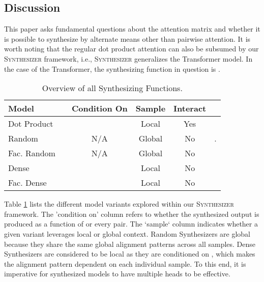 \documentclass{article} \usepackage{iclr2021_conference,times}
\begin{document}
\subsection{Discussion}
This paper asks fundamental questions about the attention matrix  and whether it is possible to synthesize  by alternate means other than pairwise attention. It is worth noting that the regular dot product attention can also be subsumed by our \textsc{Synthesizer} framework, i.e., \textsc{Synthesizer} generalizes the Transformer model. In the case of the Transformer, the synthesizing function in question is .  
\begin{table}[H]
\small
    \centering
    \begin{tabular}{l|ccccc}
    \hline
        Model &   & Condition On & Sample & Interact & \\
        \hline
        Dot Product &  &  & Local & Yes &  \\
        \hline
        Random &  & N/A & Global & No &. \\
        Fac. Random &  &  N/A & Global & No & \\
         Dense &  &  & Local & No & \\
          Fac. Dense &  &  & Local & No & \\
         \hline
    \end{tabular}
    \caption{Overview of all Synthesizing Functions.}
    \label{tab:discussion}
\end{table}
Table \ref{tab:discussion} lists the different model variants explored within our \textsc{Synthesizer} framework. The 'condition on' column refers to whether the synthesized output is produced as a function of  or every  pair. The `sample` column indicates whether a given variant leverages local or global context. Random Synthesizers are global because they share the same global alignment patterns across all samples. Dense Synthesizers are considered to be local as they are conditioned on , which makes the alignment pattern dependent on each individual sample. To this end, it is imperative for synthesized models to have multiple heads to be effective. 
\end{document}

